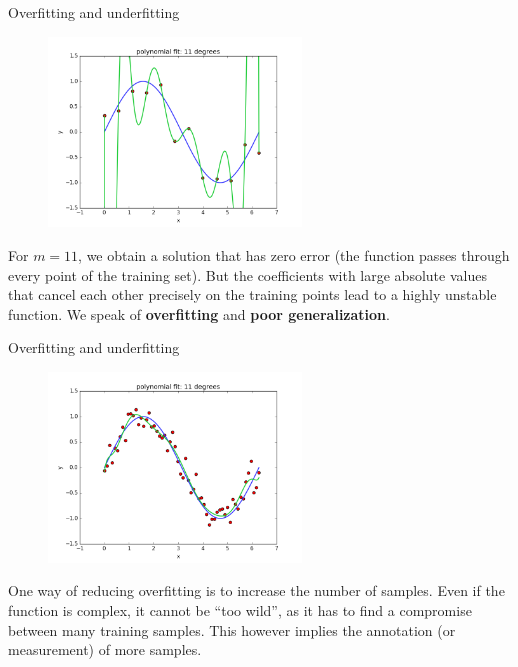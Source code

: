 \documentclass[xcolor=pdftex,dvipsnames,table]{beamer}
\begin{document}
\begin{frame}{Overfitting and underfitting}
\begin{figure}[htb]
\includegraphics[width=0.6\textwidth]{../graphics/polyfit_degree_11.png}
\end{figure}
For $m=11$, we obtain a solution that has zero error (the function passes through every point of the training set). But the coefficients with large absolute values that cancel each other precisely on the training points lead to a highly unstable function. We speak of \textbf{overfitting} and \textbf{poor generalization}.
\end{frame}

\begin{frame}{Overfitting and underfitting}
\begin{figure}[htb]
\includegraphics[width=0.6\textwidth]{../graphics/polyfit_degree_11_N60.png}
\end{figure}
One way of reducing overfitting is to increase the number of samples. Even if the function is complex, it cannot be “too wild”, as it has to find a compromise between many training samples. This however implies the annotation (or measurement) of more samples.
\end{frame}
\end{document}
